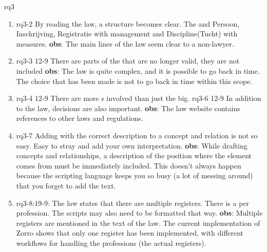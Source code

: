 \def\rq{rq3}

\acrlong{\rq}

\begin{enumerate}
    \item rq3-2 By reading the law, a structure becomes clear.
    The  and \mbox{Persoon}, \mbox{Inschrijving}, \mbox{Registratie} with management and Discipline(Tucht) with measures.
    \newline\textbf{obs}: The main lines of the law seem clear to a non-lawyer.

    \item rq3-3 12-9 There are parts of the  that are no longer valid, they are not included
    \newline\textbf{obs}: The law is quite complex, and it is possible to go back in time.
    The choice that has been made is not to go back in time within this scope.
    
    \item rq3-4 12-9 There are more s involved than just the \acrshort{big}.
    \newline rq3-6 12-9 In addition to the law, decisions are also important.
    \newline\textbf{obs}: The law website contains references to other laws and regulations.
    

    \item rq3-7 Adding  with the correct description to a concept and relation is not so easy.
    Easy to stray and add your own interpretation.
    \newline\textbf{obs}: While drafting concepts and relationships, a description of the position where the element comes from must be immediately included.
    This doesn't always happen because the scripting language keeps you so busy (a lot of messing around) that you forget to add the text.
    
    \item rq3-8:19-9: The law states that there are multiple registers.
    There is a  per profession.
    The scripts may also need to be formatted that way.
    \newline\textbf{obs}: Multiple registers are mentioned in the text of the law.
    The current implementation of Zorro shows that only one register has been implemented, with different workflows for handling the professions (the actual registers).
    

\end{enumerate}

